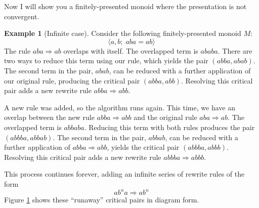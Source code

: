 \documentclass[a4paper,headsepline,bibliography=totoc,toc=flat,fleqn,twoside=semi]{scrbook}
\theoremstyle{definition}
\theoremstyle{definition}
\newtheorem{example}{Example}[chapter]
\theoremstyle{definition}
\begin{document}
Now I will show you a finitely-presented monoid where the presentation is not convergent.
\begin{example}[Infinite case]\label{infiniteex}
Consider the following finitely-presented monoid $M$:
\[\langle a, b;\; aba=ab\rangle\]
The rule $aba\Rightarrow ab$ overlaps with itself. The overlapped term is $ababa$. There are two ways to reduce this term using our rule, which yields the pair $(abba, abab)$. The second term in the pair, $abab$, can be reduced with a further application of our original rule, producing the critical pair $(abba, abb)$. Resolving this critical pair adds a new rewrite rule $abba\Rightarrow abb$.

A new rule was added, so the algorithm runs again. This time, we have an overlap between the new rule $abba\Rightarrow abb$ and the original rule $aba\Rightarrow ab$. The overlapped term is $abbaba$. Reducing this term with both rules produces the pair $(abbba, abbab)$. The second term in the pair, $abbab$, can be reduced with a further application of $abba\Rightarrow abb$, yields the critical pair $(abbba, abbb)$. Resolving this critical pair adds a new rewrite rule $abbba\Rightarrow abbb$.

This process continues forever, adding an infinite series of rewrite rules of the form
\[ab^na\Rightarrow ab^n\]
Figure \ref{infinitefig} shows these ``runaway'' critical pairs in diagram form.
\begin{figure}\label{infinitefig}
\begin{center}
\end{center}
\end{figure}
\end{example}
\end{document}
